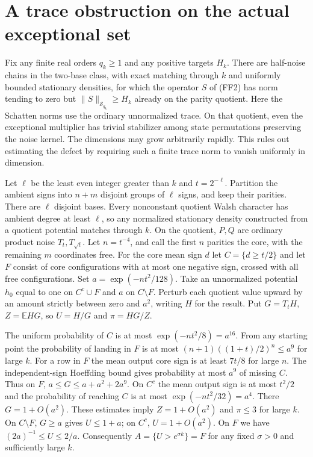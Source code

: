 \section{A trace obstruction on the actual exceptional set}
Fix any finite real orders $q_k\ge1$ and any positive targets $H_k$.
There are half-noise chains in the two-base class, with exact matching
through $k$ and uniformly bounded stationary densities, for which the
operator $S$ of (FF2) has norm tending to zero but
$\|S\|_{\mathcal S_{q_k}}\ge H_k$ already on the parity quotient.
Here the Schatten norms use the ordinary unnormalized trace. On that
quotient, even the exceptional multiplier has trivial stabilizer among
state permutations preserving the noise kernel. The dimensions may grow
arbitrarily rapidly. This rules out estimating the defect by requiring
such a finite trace norm to vanish uniformly in dimension.

Let $\ell$ be the least even integer greater than $k$ and $t=2^{-\ell}$.
Partition the ambient signs into $n+m$ disjoint groups of $\ell$ signs,
and keep their parities. There are $\ell$ disjoint bases. Every nonconstant
quotient Walsh character has ambient degree at least $\ell$, so any
normalized stationary density constructed from a quotient potential
matches through $k$. On the quotient, $P,Q$ are ordinary product noise
$T_t,T_{\sqrt t}$. Let $n=t^{-4}$, and call the first $n$ parities the
core, with the remaining $m$ coordinates free. For the core mean sign $d$
let $C=\{d\ge t/2\}$ and let $F$ consist of core configurations with at
most one negative sign, crossed with all free configurations. Set
$a=\exp(-nt^2/128)$. Take an unnormalized potential $h_0$ equal to one
on $C^c\cup F$ and $a$ on $C\setminus F$. Perturb each quotient value
upward by an amount strictly between zero and $a^2$, writing $H$ for
the result. Put $G=T_tH$, $Z=\mathbb E HG$, so $U=H/G$ and $\pi=HG/Z$.

The uniform probability of $C$ is at most $\exp(-nt^2/8)=a^{16}$.
From any starting point the probability of landing in $F$ is at most
$(n+1)((1+t)/2)^n\le a^9$ for large $k$. For a row in $F$ the mean
output core sign is at least $7t/8$ for large $n$.
The independent-sign Hoeffding bound gives probability at most $a^9$
of missing $C$. Thus on $F$, $a\le G\le a+a^2+2a^9$.
On $C^c$ the mean output sign is at most $t^2/2$ and the probability
of reaching $C$ is at most $\exp(-nt^2/32)=a^4$. There $G=1+O(a^2)$.
These estimates imply $Z=1+O(a^2)$ and $\pi\le3$ for large $k$.
On $C\setminus F$, $G\ge a$ gives $U\le1+a$; on $C^c$,
$U=1+O(a^2)$. On $F$ we have $(2a)^{-1}\le U\le2/a$.
Consequently $A=\{U>e^{\sigma k}\}=F$ for any fixed $\sigma>0$
and sufficiently large $k$.

